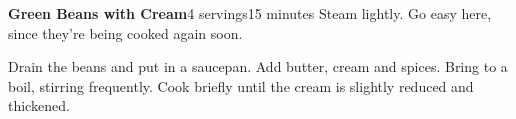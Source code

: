 \documentclass[../Cookbook.tex]{subfiles}
\begin{document}
\begin{recipe}[CreamBeans]{\textbf{Green Beans with Cream}}{4 servings}{15 minutes}
Steam lightly. Go easy here, since they're being cooked again soon.

Drain the beans and put in a saucepan.
Add butter, cream and spices.
Bring to a boil, stirring frequently.
Cook briefly until the cream is slightly reduced and thickened.
\end{recipe}
\end{document}
